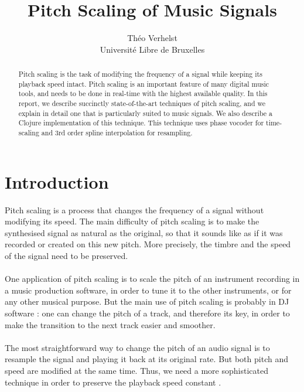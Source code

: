 \documentclass[letterpaper]{article}
\title{Pitch Scaling of Music Signals}
\author{Théo Verhelst \\
Université Libre de Bruxelles}
\begin{document}
\maketitle

\begin{abstract}
Pitch scaling is the task of modifying the frequency of a signal while keeping
its playback speed intact. Pitch scaling is an important feature of many digital
music tools, and needs to be done in real-time with the highest available
quality. In this report, we describe succinctly state-of-the-art techniques of
pitch scaling, and we explain in detail one that is particularly suited to music
signals. We also describe a Clojure implementation of this technique. This
technique uses phase vocoder for time-scaling and 3rd order spline interpolation
for resampling.
\end{abstract}

\section{Introduction}
Pitch scaling is a process that changes the frequency of a signal without
modifying its speed. The main difficulty of pitch scaling is to make the
synthesised signal as natural as the original, so that it sounds like as if it
was recorded or created on this new pitch. More precisely, the timbre and the
speed of the signal need to be preserved.

\paragraph{}
One application of pitch scaling is to scale the pitch of an instrument
recording in a music production software, in order to tune it to the other
instruments, or for any other musical purpose. But the main use of pitch scaling
is probably in DJ software \citep{Cliff00hangthe}: one can change the pitch of a
track, and therefore its key, in order to make the transition to the next track
easier and smoother.

\paragraph{}
The most straightforward way to change the pitch of an audio signal is to
resample the signal and playing it back at its original rate. But
both pitch and speed are modified at the same time. Thus, we need a more
sophisticated technique in order to preserve the playback speed constant
\citep{DM}.
\end{document}
